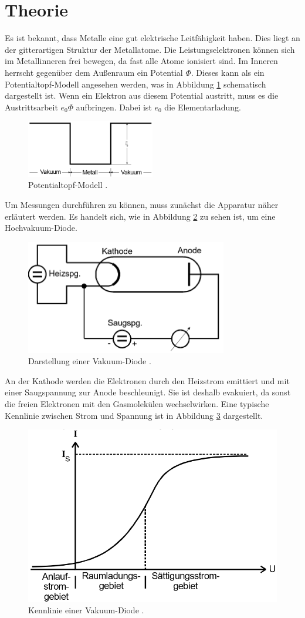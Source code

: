 \section{Theorie}
Es ist bekannt, dass Metalle eine gut elektrische Leitfähigkeit haben. Dies liegt an der gitterartigen Struktur der Metallatome.
Die Leistungselektronen können sich im Metallinneren frei bewegen, da fast alle Atome ionisiert sind. Im Inneren herrscht gegenüber dem
Außenraum ein Potential $\Phi$.
Dieses kann als ein Potentialtopf-Modell angesehen werden, was in Abbildung \ref{abb:1} schematisch
dargestellt ist. Wenn ein Elektron aus diesem Potential austritt, muss
es die Austrittsarbeit $e_0 \Phi$ aufbringen. Dabei ist $e_0$ die Elementarladung.
\begin{figure}[H]
  \centering
  \includegraphics[width=5 cm, height= 2.5cm]{content/Potentialtopf.png}
  \caption{Potentialtopf-Modell \cite{1}.}
  \label{abb:1}
\end{figure}
Um Messungen durchführen zu können, muss zunächst die Apparatur näher erläutert werden.
Es handelt sich, wie in  Abbildung \ref{abb:2} zu sehen ist, um eine Hochvakuum-Diode.
\begin{figure}[H]
  \centering
  \includegraphics[width=10 cm, height =5cm]{content/Aufbau.png}
  \caption{Darstellung einer Vakuum-Diode \cite{1}.}
  \label{abb:2}
\end{figure}
An der Kathode werden die Elektronen durch den Heizstrom emittiert und mit einer Saugspannung zur
Anode beschleunigt. Sie ist deshalb evakuiert, da sonst die freien Elektronen mit den Gasmolekülen wechselwirken.
Eine typische Kennlinie zwischen Strom und Spannung ist in Abbildung \ref{abb:3} dargestellt.
\begin{figure}[H]
  \centering
  \includegraphics[width=10 cm , height= 5 cm]{content/Kennlinie.png}
  \caption{Kennlinie einer Vakuum-Diode \cite{1}.}
  \label{abb:3}
\end{figure}
